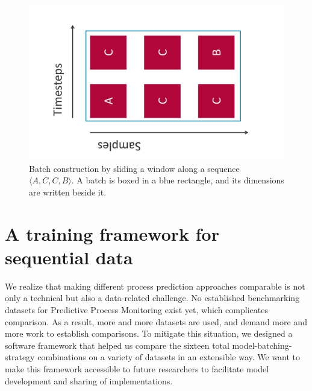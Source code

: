 \begin{figure}[!htb]
    \centering
    \includegraphics[width=.55\textwidth,angle=-90,origin=c]{gfx/windowing-strategy.pdf}
    \caption[Windowing strategy for batches]{Batch construction by sliding a window along a sequence $\langle A,C,C,B\rangle$. A batch is boxed in a blue rectangle, and its dimensions are written beside it.}
    \label{fig:windowing-strategy-example}
\end{figure}

\section{A training framework for sequential data}
\label{sec:contrib:training-framework}
We realize that making different process prediction approaches comparable is not only a technical but also a data-related challenge.
No established benchmarking datasets for Predictive Process Monitoring exist yet, which complicates comparison.
As a result, more and more datasets are used, and demand more and more work to establish comparisons.
To mitigate this situation, we designed a software framework that helped us compare the sixteen total model-batching-strategy combinations on a variety of datasets in an extensible way.
We want to make this framework accessible to future researchers to facilitate model development and sharing of implementations.\\

